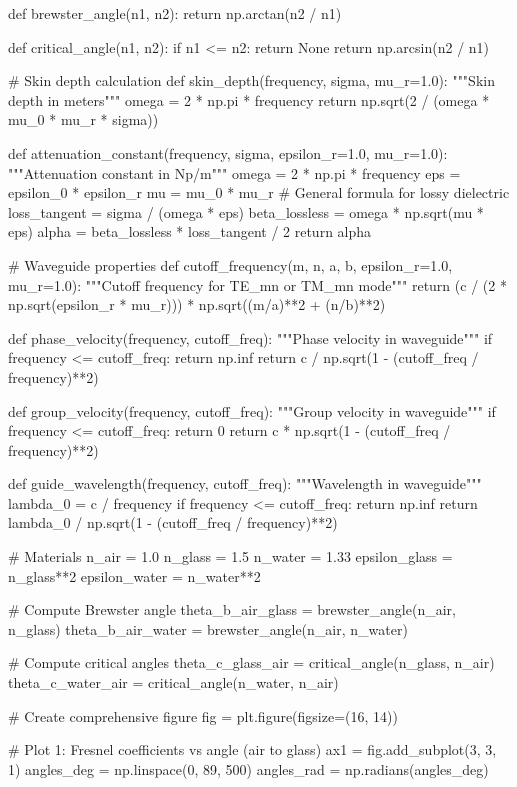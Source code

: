 \documentclass[a4paper, 11pt]{article}
\begin{document}
\begin{pycode}
def brewster_angle(n1, n2):
    return np.arctan(n2 / n1)

def critical_angle(n1, n2):
    if n1 <= n2:
        return None
    return np.arcsin(n2 / n1)

# Skin depth calculation
def skin_depth(frequency, sigma, mu_r=1.0):
    """Skin depth in meters"""
    omega = 2 * np.pi * frequency
    return np.sqrt(2 / (omega * mu_0 * mu_r * sigma))

def attenuation_constant(frequency, sigma, epsilon_r=1.0, mu_r=1.0):
    """Attenuation constant in Np/m"""
    omega = 2 * np.pi * frequency
    eps = epsilon_0 * epsilon_r
    mu = mu_0 * mu_r
    # General formula for lossy dielectric
    loss_tangent = sigma / (omega * eps)
    beta_lossless = omega * np.sqrt(mu * eps)
    alpha = beta_lossless * loss_tangent / 2
    return alpha

# Waveguide properties
def cutoff_frequency(m, n, a, b, epsilon_r=1.0, mu_r=1.0):
    """Cutoff frequency for TE_mn or TM_mn mode"""
    return (c / (2 * np.sqrt(epsilon_r * mu_r))) * np.sqrt((m/a)**2 + (n/b)**2)

def phase_velocity(frequency, cutoff_freq):
    """Phase velocity in waveguide"""
    if frequency <= cutoff_freq:
        return np.inf
    return c / np.sqrt(1 - (cutoff_freq / frequency)**2)

def group_velocity(frequency, cutoff_freq):
    """Group velocity in waveguide"""
    if frequency <= cutoff_freq:
        return 0
    return c * np.sqrt(1 - (cutoff_freq / frequency)**2)

def guide_wavelength(frequency, cutoff_freq):
    """Wavelength in waveguide"""
    lambda_0 = c / frequency
    if frequency <= cutoff_freq:
        return np.inf
    return lambda_0 / np.sqrt(1 - (cutoff_freq / frequency)**2)

# Materials
n_air = 1.0
n_glass = 1.5
n_water = 1.33
epsilon_glass = n_glass**2
epsilon_water = n_water**2

# Compute Brewster angle
theta_b_air_glass = brewster_angle(n_air, n_glass)
theta_b_air_water = brewster_angle(n_air, n_water)

# Compute critical angles
theta_c_glass_air = critical_angle(n_glass, n_air)
theta_c_water_air = critical_angle(n_water, n_air)

# Create comprehensive figure
fig = plt.figure(figsize=(16, 14))

# Plot 1: Fresnel coefficients vs angle (air to glass)
ax1 = fig.add_subplot(3, 3, 1)
angles_deg = np.linspace(0, 89, 500)
angles_rad = np.radians(angles_deg)


\end{pycode}
\end{document}

